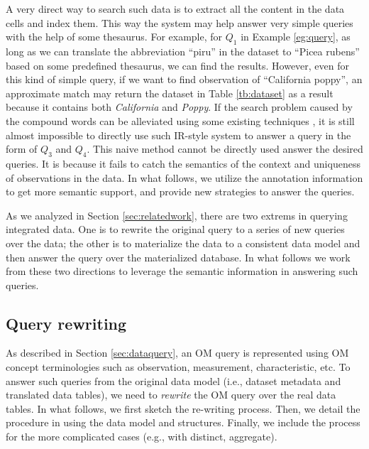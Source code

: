\documentclass[conference]{IEEEtran}
\begin{document}
A very direct way to search such data is to extract all the content in
the data cells and index them. This way the system may help answer
very simple queries with the help of some thesaurus. 
For example, for $Q_1$ in Example \ref{eg:query}, as long as we can
translate the abbreviation ``piru'' in the dataset to ``Picea rubens''
based on some predefined thesaurus, we can find the results. 
However, even for this kind of simple query, if we want to find
observation of ``California poppy'', an approximate match may return
the dataset in Table \ref{tb:dataset} as a result because it contains
both {\em California} and {\em Poppy}.
If the search problem caused by the compound words can be alleviated using some existing
techniques \cite{***}, %
it is still almost impossible to directly use such IR-style system to answer a query
in the form of $Q_3$ and $Q_4$. 
This naive method cannot be directly used answer the desired queries. It is because it
fails to catch the semantics of the context and uniqueness of observations in the data. 
In what follows, we utilize the annotation information to get
more semantic support, and provide new strategies to answer the
queries. 

As we analyzed in Section \ref{sec:relatedwork}, there are two extrems
in querying integrated data. 
One is to rewrite the original query to a series of new queries over
the data; the other is to materialize the data to a consistent data
model and then answer the query over the materialized database. 
In what follows we work from these two directions to leverage the
semantic information in answering such queries. 

\subsection{Query rewriting}\label{sec:queryrewrite}

As described in Section \ref{sec:dataquery}, 
an OM query is represented using 
OM concept terminologies such as observation, 
measurement, characteristic, etc. 
To answer such queries from the original data model (i.e., dataset 
metadata and translated data tables), 
we need to {\em rewrite} the OM query over the real data tables. 
In what follows, we first sketch the re-writing process. 
Then, we detail the procedure in using the data model and structures. 
Finally, we include the process for the more complicated
cases (e.g., with distinct, aggregate). 
\end{document}
